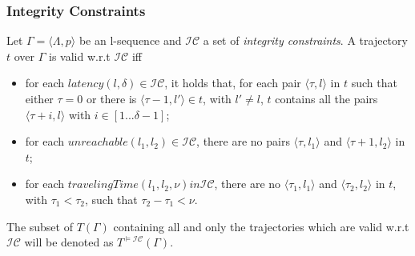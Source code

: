\begin{frame}
\frametitle{Integrity Constraints}

\begin{definition}
  Let $\Gamma = \langle \Lambda, p \rangle$ be an l-sequence and $\mathcal{IC}$ a set of \emph{integrity constraints}. A trajectory $t$ over $\Gamma$ is valid w.r.t $\mathcal{IC}$ iff
  \begin{itemize}

    \item for each $latency(l, \delta) \in \mathcal{IC}$, it holds that, for each pair $\langle \tau,l \rangle$ in $t$ such that either $\tau = 0$ or there is $\langle \tau-1, l' \rangle \in t$, with $l' \neq l$, $t$ contains all the pairs $\langle \tau+i,l \rangle$ with $i \in [1...\delta-1]$;

    \item for each $unreachable(l_1, l_2) \in \mathcal{IC}$, there are no pairs $\langle \tau,l_1 \rangle$ and $\langle \tau+1,l_2 \rangle$ in $t$;

    \item for each $travelingTime(l_1, l_2, \nu) in \mathcal{IC}$, there are no $\langle \tau_1, l_1 \rangle$ and $\langle \tau_2, l_2 \rangle$ in $t$, with $\tau_1 < \tau_2$, such that $\tau_2 - \tau_1 < \nu$.

  \end{itemize}
\end{definition}

\textrm{The subset of $T(\Gamma)$ containing all and only the trajectories which are valid w.r.t $\mathcal{IC}$ will be denoted as $T^{\models\mathcal{IC}}(\Gamma)$.}

\end{frame}


